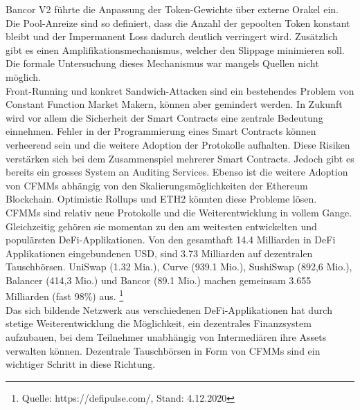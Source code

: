 \documentclass[12pt,a4paper,titlepage,oneside,english]{article}
\begin{document}
Bancor V2 führte die Anpassung der Token-Gewichte über externe Orakel ein. Die Pool-Anreize sind so definiert, dass die Anzahl der gepoolten Token konstant bleibt und der Impermanent Loss dadurch deutlich verringert wird. Zusätzlich gibt es einen Amplifikationsmechanismus, welcher den Slippage minimieren soll. Die formale Untersuchung dieses Mechanismus war mangels Quellen nicht möglich. \\
Front-Running und konkret Sandwich-Attacken sind ein bestehendes Problem von Constant Function Market Makern, können aber gemindert werden. %
In Zukunft wird vor allem die Sicherheit der Smart Contracts eine zentrale Bedeutung einnehmen. Fehler in der Programmierung eines Smart Contracts können verheerend sein und die weitere Adoption der Protokolle aufhalten. Diese Risiken verstärken sich bei dem Zusammenspiel mehrerer Smart Contracts. Jedoch gibt es bereits ein grosses System an Auditing Services. Ebenso ist die weitere Adoption von CFMMs abhängig von den Skalierungsmöglichkeiten der Ethereum Blockchain. Optimistic Rollups und ETH2 könnten diese Probleme lösen. \\
CFMMs sind relativ neue Protokolle und die Weiterentwicklung in vollem Gange. Gleichzeitig gehören sie momentan zu den am weitesten entwickelten und populärsten DeFi-Applikationen. Von den gesamthaft 14.4 Milliarden in DeFi Applikationen eingebundenen USD, sind 3.73 Milliarden auf dezentralen Tauschbörsen. UniSwap (1.32 Mia.), Curve (939.1 Mio.), SushiSwap (892,6 Mio.), Balancer (414,3 Mio.) und Bancor (89.1 Mio.) machen gemeinsam 3.655 Milliarden (fast 98\%) aus. \footnote{Quelle: https://defipulse.com/, Stand: 4.12.2020}  \\
Das sich bildende Netzwerk aus verschiedenen DeFi-Applikationen hat durch stetige Weiterentwicklung die Möglichkeit, ein dezentrales Finanzsystem aufzubauen, bei dem Teilnehmer unabhängig von Intermediären ihre Assets verwalten können. Dezentrale Tauschbörsen in Form von CFMMs sind ein wichtiger Schritt in diese Richtung.



\end{document}
